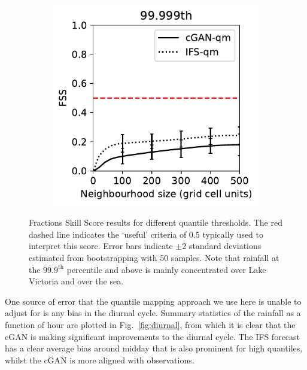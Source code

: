 \documentclass{article}
\begin{document}
\begin{figure}[t]
\begin{subfigure}[t]{0.32\textwidth}
     \caption{}
     \end{subfigure}
     \begin{subfigure}[t]{0.32\textwidth}
     \includegraphics[width=\textwidth]{images/fss_q99.999th_final-nologs_217600.pdf}
     \caption{}
     \end{subfigure}
     \caption{Fractions Skill Score results for different quantile thresholds. The red dashed line indicates the `useful' criteria of 0.5 typically used to interpret this score. Error bars indicate $\pm2$ standard deviations estimated from bootstrapping with 50 samples. Note that rainfall at the $99.9^{\text{th}}$ percentile and above is mainly concentrated over Lake Victoria and over the sea. }
     \label{fig:fss}
\end{figure}

One source of error that the quantile mapping approach we use here is unable to adjust for is any bias in the diurnal cycle. Summary statistics of the rainfall as a function of hour are plotted in Fig.~\ref{fig:diurnal}, from which it is clear that the cGAN is making significant improvements to the diurnal cycle. The IFS forecast has a clear average bias around midday that is also prominent for high quantiles, whilst the cGAN is more aligned with observations.
\end{document}
